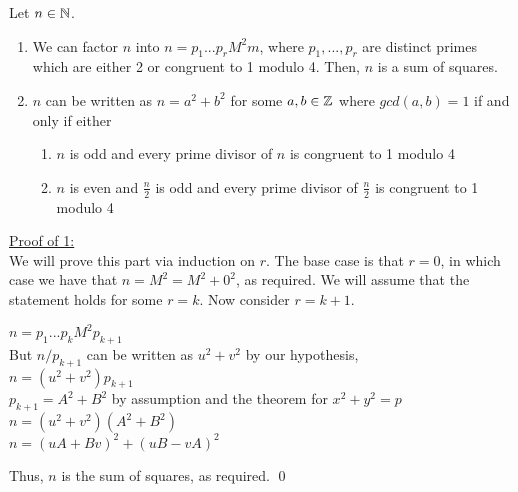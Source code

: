 \documentclass[../main.tex]{subfiles}
\begin{document}
\begin{thm}
    Let $n \in \mathbb{N}$. 
    \begin{enumerate}
        \item We can factor $n$ into $n=p_1...p_rM^2m$, where $p_1,...,p_r$ are distinct primes which are either 2 or congruent to 1 modulo 4. Then, $n$ is a sum of squares.
        \item $n$ can be written as $n=a^2+b^2$ for some $a,b \in \mathbb{Z}$ where $gcd(a,b)=1$ if and only if either
        \begin{enumerate}
             \item $n$ is odd and every prime divisor of $n$ is congruent to 1 modulo 4
             \item $n$ is even and $\tfrac{n}{2}$ is odd and every prime divisor of $\tfrac{n}{2}$ is congruent to 1 modulo 4
        \end{enumerate}
    \end{enumerate}
\end{thm}
\begin{pf}
    \underline{Proof of 1:} \\
    We will prove this part via induction on $r$. The base case is that $r=0$, in which case we have that $n=M^2=M^2+0^2$, as required. We will assume that the statement holds for some $r=k$. Now consider $r=k+1$.
    \begin{center}
        $n=p_1...p_kM^2p_{k+1}$ \\
        But $n/p_{k+1}$ can be written as $u^2+v^2$ by our hypothesis, \\
        $n=(u^2+v^2)p_{k+1}$ \\
        $p_{k+1}=A^2+B^2$ by assumption and the theorem for $x^2+y^2=p$ \\
        $n=(u^2+v^2)(A^2+B^2)$ \\
        $n=(uA+Bv)^2+(uB-vA)^2$
    \end{center}
    Thus, $n$ is the sum of squares, as required. \qed
\end{pf}
\end{document}
